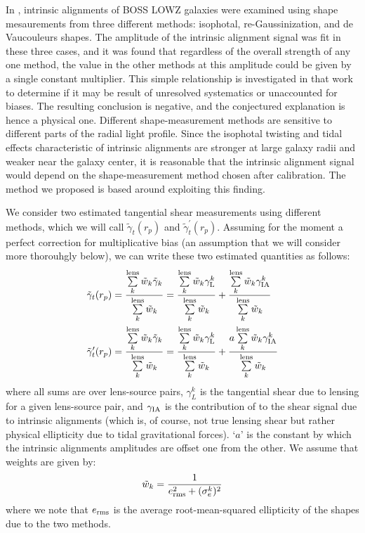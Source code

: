 \documentclass[a4paper,fleqn,usenatbib,useAMS]{mnras}
\begin{document}
In \cite{Singh2016}, intrinsic alignments of BOSS LOWZ galaxies were examined using shape mesaurements from three different methods: isophotal, re-Gaussinization, and de Vaucouleurs shapes. The amplitude of the intrinsic alignment signal was fit in these three cases, and it was found that regardless of the overall strength of any one method, the value in the other methods at this amplitude could be given by a single constant multiplier. This simple relationship is investigated in that work to determine if it may be result of unresolved systematics or unaccounted for biases. The resulting conclusion is negative, and the conjectured explanation is hence a physical one. Different shape-measurement methods are sensitive to different parts of the radial light profile. Since the isophotal twisting and tidal effects characteristic of intrinsic alignments are stronger at large galaxy radii and weaker near the galaxy center, it is reasonable that the intrinsic alignment signal would depend on the shape-measurement method chosen after calibration. The method we proposed is based around exploiting this finding.

We consider two estimated tangential shear measurements using different methods, which we will call $\tilde{\gamma}_t(r_p)$ and $\tilde{\gamma}_t^\prime(r_p)$. Assuming for the moment a perfect correction for multiplicative bias (an assumption that we will consider more thorouhgly below), we can write these two estimated quantities as follows:
\begin{align}
\tilde{\gamma}_t(r_p) &= \frac{\sum\limits_{k}^{\rm lens} \tilde{w}_k \tilde{\gamma}_k}{\sum\limits_{k}^{\rm lens} \tilde{w}_k} = \frac{\sum\limits_{k}^{\rm lens} \tilde{w}_k \gamma_{\rm L}^k}{\sum\limits_{k}^{\rm lens} \tilde{w}_k}+\frac{\sum\limits_{k}^{\rm lens} \tilde{w}_k \gamma_{\rm IA}^k}{\sum\limits_{k}^{\rm lens} \tilde{w}_k} \nonumber \\ 
\tilde{\gamma}_t^\prime (r_p) &= \frac{\sum\limits_{k}^{\rm lens} \tilde{w}_k \tilde{\gamma}_k}{\sum\limits_{k}^{\rm lens} \tilde{w}_k} = \frac{\sum\limits_{k}^{\rm lens} \tilde{w}_k \gamma_{\rm L}^k}{\sum\limits_{k}^{\rm lens} \tilde{w}_k}+\frac{a \sum\limits_{k}^{\rm lens} \tilde{w}_k \gamma_{\rm IA}^k}{\sum\limits_{k}^{\rm lens} \tilde{w}_k} 
\label{full_both}
\end{align}
where all sums are over lens-source pairs, $\gamma_L^k$ is the tangential shear due to lensing for a given lens-source pair, and $\gamma_{\rm IA}$ is the contribution of to the shear signal due to intrinsic alignments (which is, of course, not true lensing shear but rather physical ellipticity due to tidal gravitational forces). `$a$' is the constant by which the intrinsic alignments amplitudes are offset one from the other. We assume that weights are given by:
\begin{equation}
\tilde{w}_k = \frac{1}{e_{\rm rms}^2 + (\sigma_e^k)^2}
\label{weights}
\end{equation}
where we note that $e_{\rm rms}$ is the average root-mean-squared ellipticity of the shapes due to the two methods.
\end{document}
